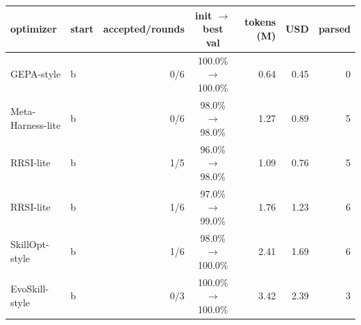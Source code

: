 \begin{tabular}{llrcrrr}
\toprule
optimizer & start & accepted/rounds & init $\rightarrow$ best val & tokens (M) & USD & parsed \\
\midrule
GEPA-style & b & 0/6 & 100.0\% $\rightarrow$ 100.0\% & 0.64 & 0.45 & 0 \\
Meta-Harness-lite & b & 0/6 & 98.0\% $\rightarrow$ 98.0\% & 1.27 & 0.89 & 5 \\
RRSI-lite & b & 1/5 & 96.0\% $\rightarrow$ 98.0\% & 1.09 & 0.76 & 5 \\
RRSI-lite & b & 1/6 & 97.0\% $\rightarrow$ 99.0\% & 1.76 & 1.23 & 6 \\
SkillOpt-style & b & 1/6 & 98.0\% $\rightarrow$ 100.0\% & 2.41 & 1.69 & 6 \\
EvoSkill-style & b & 0/3 & 100.0\% $\rightarrow$ 100.0\% & 3.42 & 2.39 & 3 \\
\bottomrule
\end{tabular}
